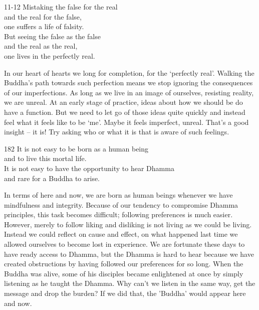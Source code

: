 
\begin{dhpVerse}{11-12}
\label{dhp-11}\label{dhp-12}
Mistaking the false for the real\\
and the real for the false,\\
one suffers a life of falsity.\\
But seeing the false as the false\\
and the real as the real,\\
one lives in the perfectly real.
\end{dhpVerse}

\begin{dhpRefl}
  In our heart of hearts we long for completion, for the ‘perfectly real’.
  Walking the Buddha’s path towards such perfection means we stop ignoring the
  consequences of our imperfections. As long as we live in an image of
  ourselves, resisting reality, we are unreal. At an early stage of practice,
  ideas about how we should be do have a function. But we need to let go of
  those ideas quite quickly and instead feel what it feels like to be ‘me’.
  Maybe it feels imperfect, unreal. That’s a good insight -- it is! Try asking
  who or what it is that is aware of such feelings.
\end{dhpRefl}


\begin{dhpVerse}{182}
\label{dhp-182}
It is not easy to be born as a human being\\
and to live this mortal life.\\
It is not easy to have the opportunity to hear Dhamma\\
and rare for a Buddha to arise.
\end{dhpVerse}

\begin{dhpRefl}
  In terms of here and now, we are born as human beings whenever we have
  mindfulness and integrity. Because of our tendency to compromise Dhamma
  principles, this task becomes difficult; following preferences is much easier.
  However, merely to follow liking and disliking is not living as we could be
  living. Instead we could reflect on cause and effect, on what happened last
  time we allowed ourselves to become lost in experience. We are fortunate these
  days to have ready access to Dhamma, but the Dhamma is hard to hear because we
  have created obstructions by having followed our preferences for so long. When
  the Buddha was alive, some of his disciples became enlightened at once by
  simply listening as he taught the Dhamma. Why can’t we listen in the same way,
  get the message and drop the burden? If we did that, the 'Buddha' would appear
  here and now.
\end{dhpRefl}

